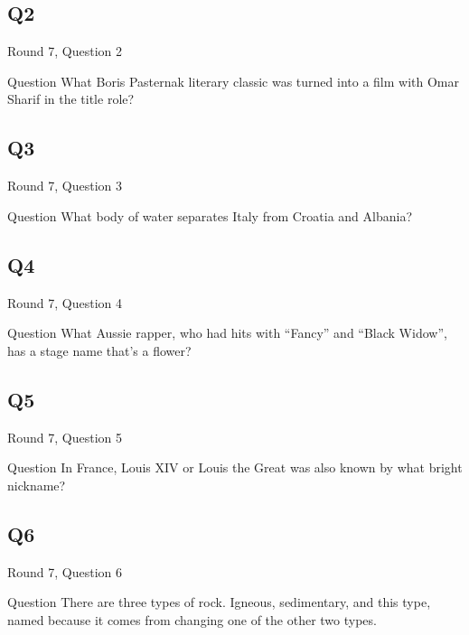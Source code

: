 \documentclass[11pt]{beamer}
\begin{document}
\subsection*{Q2}
\begin{frame}[t]{Round 7, Question 2}
\vspace{2em}
\begin{block}{Question}
What Boris Pasternak literary classic was turned into a film with Omar Sharif in the title role\@?
\end{block}
\end{frame}
    

\subsection*{Q3}
\begin{frame}[t]{Round 7, Question 3}
\vspace{2em}
\begin{block}{Question}
What body of water separates Italy from Croatia and Albania\@?
\end{block}
\end{frame}
    

\subsection*{Q4}
\begin{frame}[t]{Round 7, Question 4}
\vspace{2em}
\begin{block}{Question}
What Aussie rapper, who had hits with ``Fancy'' and ``Black Widow'', has a stage name that's a flower\@?
\end{block}
\end{frame}
    

\subsection*{Q5}
\begin{frame}[t]{Round 7, Question 5}
\vspace{2em}
\begin{block}{Question}
In France, Louis XIV or Louis the Great was also known by what bright nickname\@?
\end{block}
\end{frame}
    

\subsection*{Q6}
\begin{frame}[t]{Round 7, Question 6}
\vspace{2em}
\begin{block}{Question}
There are three types of rock. Igneous, sedimentary, and this type, named because it comes from changing one of the other two types.
\end{block}
\end{frame}
    
\end{document}
